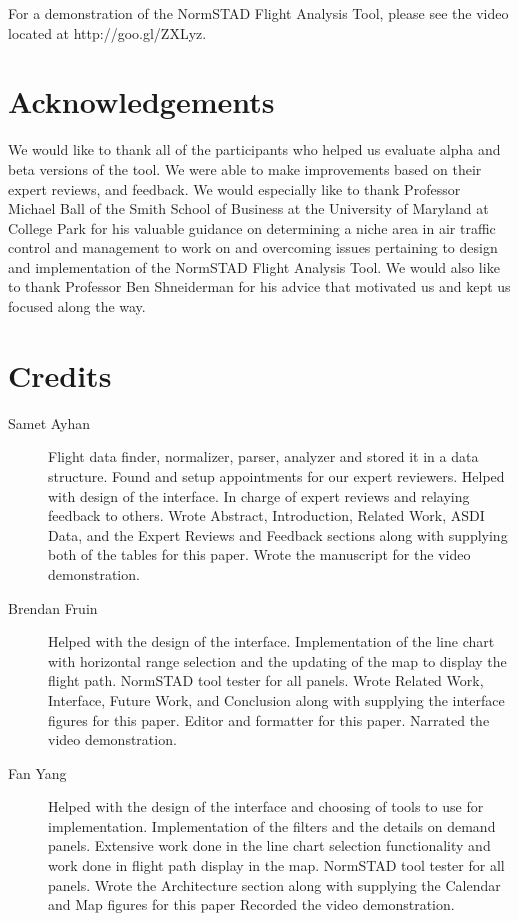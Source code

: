 \documentclass{sig-alternate}
\begin{document}
For a demonstration of the NormSTAD Flight Analysis Tool, please see the video
located at http://goo.gl/ZXLyz.

\section{Acknowledgements}
\label{sec-acknowledgements}
We would like to thank all of the
participants who helped us evaluate alpha and
beta versions of the tool. We were able to make
improvements based on their expert reviews,
and feedback. We would especially like to thank
Professor Michael Ball of the Smith School of Business 
at the University of Maryland at College Park for his valuable guidance
on determining a niche area in air traffic control
and management to work on and overcoming issues
pertaining to design and implementation of the NormSTAD Flight
Analysis Tool. We would also like to thank
Professor Ben Shneiderman for his advice that
motivated us and kept us focused along the way.

\section{Credits}

\begin{description}
\item[Samet Ayhan]
Flight data finder, normalizer, parser, analyzer and stored it in a data structure. Found 
and setup appointments for our expert reviewers. Helped with
design of the interface. In charge of expert reviews
and relaying feedback to others. Wrote Abstract, Introduction, Related Work, ASDI
Data, and the Expert Reviews and Feedback sections along with 
supplying both of the tables for this paper. Wrote the manuscript for the 
video demonstration.

\item[Brendan Fruin]
Helped with the design of the interface.
Implementation of the line chart with horizontal range selection and the 
updating of the map to display the flight path. NormSTAD tool tester for all
panels. Wrote Related Work, Interface, Future Work,
and Conclusion along with supplying the interface figures for this paper. 
Editor and formatter for this paper. Narrated the video demonstration.

\item[Fan Yang]
Helped with the design of the interface and choosing of tools to use for implementation.
Implementation of the filters and the details on demand panels. Extensive
work done in the line chart selection functionality and work done in flight path
display in the map.
NormSTAD tool tester for all panels. Wrote the Architecture section
along with supplying the Calendar and Map figures for this paper
Recorded the video demonstration.

\end{description}
\end{document}
